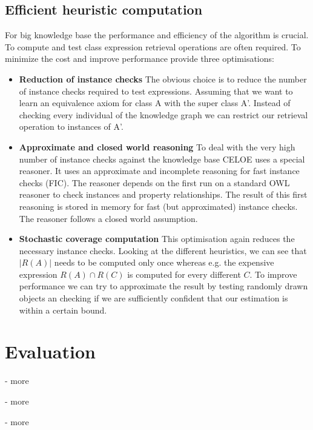 \subsection{Efficient heuristic computation}
For big knowledge base the performance and efficiency of the algorithm is
crucial. To compute and test class expression retrieval operations are often
required. To minimize the cost and improve performance \cite{paper1} provide
three optimisations:
\begin{itemize}
  \item{\textbf{Reduction of instance checks}} 
  The obvious choice is to reduce the number of instance checks required to test
  expressions. Assuming that we want to learn an equivalence axiom for class A
  with the super class A'. Instead of checking every individual of the knowledge
  graph we can restrict our retrieval operation to instances of A'.
  
  \item{\textbf{Approximate and closed world reasoning}} 
  To deal with the very high number of instance checks against the knowledge
  base CELOE uses a special reasoner.\cite{paper1} It uses an approximate and
  incomplete reasoning for fast instance checks (FIC). The reasoner depends on
  the first run on a standard OWL reasoner to check instances and property
  relationships. The result of this first reasoning is stored in memory for fast
  (but approximated) instance checks. The reasoner follows a closed world
  assumption.
  
  \item{\textbf{Stochastic coverage computation}} 
  This optimisation again reduces the necessary instance checks. Looking at the
  different heuristics, we can see that $|R(A)|$ needs to be computed only once
  whereas e.g. the expensive expression $R(A) \cap R(C)$ is computed for every
  different $C$. To improve performance we can try to approximate the result by
  testing randomly drawn objects an checking if we are sufficiently confident
  that our estimation is within a certain bound.
  
  
\end{itemize}


\section{Evaluation}
- more

- more

- more


